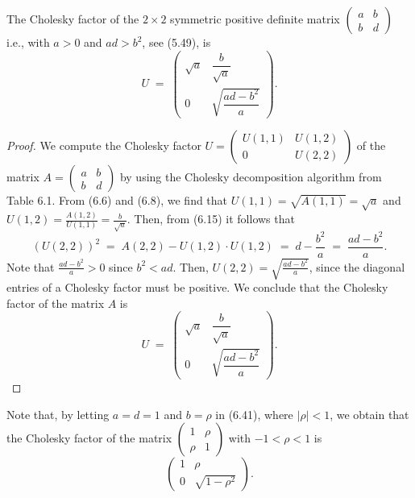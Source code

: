 \begin{lemma}
The Cholesky factor of the $2 \times 2$ symmetric positive definite matrix
$\begin{pmatrix} a & b \\ b & d \end{pmatrix}$ i.e., with $a > 0$ and $ad > b^2$, see
(5.49), is
\begin{equation}
U \;=\; \begin{pmatrix} \sqrt{a} & \dfrac{b}{\sqrt{a}} \\[0.6em] 0 & \sqrt{\dfrac{ad-b^2}{a}} \end{pmatrix}.
\end{equation}
\end{lemma}

\begin{proof}
We compute the Cholesky factor $U = \begin{pmatrix} U(1,1) & U(1,2) \\ 0 & U(2,2)
\end{pmatrix}$ of the matrix $A = \begin{pmatrix} a & b \\ b & d \end{pmatrix}$ by using
the Cholesky decomposition algorithm from Table 6.1. From (6.6) and (6.8), we find that
$U(1,1) = \sqrt{A(1,1)} = \sqrt{a}$ and $U(1,2) = \frac{A(1,2)}{U(1,1)} = \frac{b}{\sqrt{a}}$.
Then, from (6.15) it follows that
\[
(U(2,2))^2 \;=\; A(2,2) - U(1,2) \cdot U(1,2) \;=\; d - \frac{b^2}{a} \;=\; \frac{ad-b^2}{a}.
\]
Note that $\frac{ad-b^2}{a} > 0$ since $b^2 < ad$. Then, $U(2,2) = \sqrt{\frac{ad-b^2}{a}}$,
since the diagonal entries of a Cholesky factor must be positive. We conclude that the
Cholesky factor of the matrix $A$ is
\[
U \;=\; \begin{pmatrix} \sqrt{a} & \dfrac{b}{\sqrt{a}} \\[0.6em] 0 & \sqrt{\dfrac{ad-b^2}{a}} \end{pmatrix}.
\]
\end{proof}

Note that, by letting $a = d = 1$ and $b = \rho$ in (6.41), where $|\rho| < 1$, we
obtain that the Cholesky factor of the matrix $\begin{pmatrix} 1 & \rho \\ \rho & 1
\end{pmatrix}$ with $-1 < \rho < 1$ is
\begin{equation}
\begin{pmatrix} 1 & \rho \\ 0 & \sqrt{1-\rho^2} \end{pmatrix}.
\end{equation}

